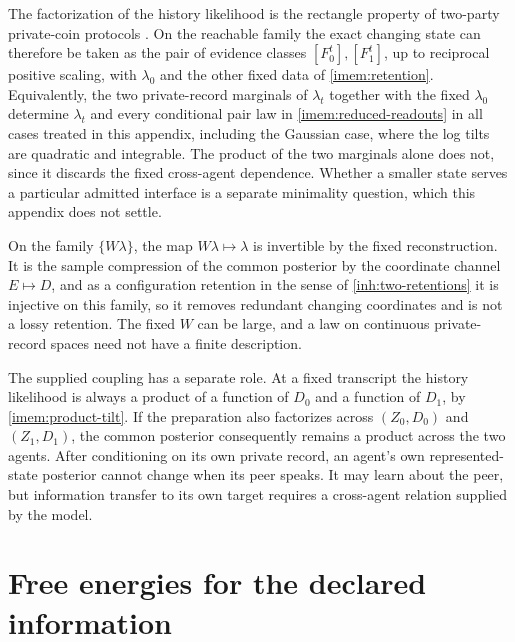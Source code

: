 The factorization of the history likelihood is the rectangle property of two-party private-coin protocols \citep[Lemma 6.7]{BarYossefEtAl2004}. On the reachable family the exact changing state can therefore be taken as the pair of evidence classes $[F_0^t],[F_1^t]$, up to reciprocal positive scaling, with $\lambda_0$ and the other fixed data of \cref{imem:retention}. Equivalently, the two private-record marginals of $\lambda_t$ together with the fixed $\lambda_0$ determine $\lambda_t$ and every conditional pair law in \cref{imem:reduced-readouts} in all cases treated in this appendix, including the Gaussian case, where the log tilts are quadratic and integrable. The product of the two marginals alone does not, since it discards the fixed cross-agent dependence. Whether a smaller state serves a particular admitted interface is a separate minimality question, which this appendix does not settle.

On the family $\{W\lambda\}$, the map $W\lambda\mapsto\lambda$ is invertible by the fixed reconstruction. It is the sample compression of the common posterior by the coordinate channel $E\mapsto D$, and as a configuration retention in the sense of \cref{inh:two-retentions} it is injective on this family, so it removes redundant changing coordinates and is not a lossy retention. The fixed $W$ can be large, and a law on continuous private-record spaces need not have a finite description.

The supplied coupling has a separate role. At a fixed transcript the history likelihood is always a product of a function of $D_0$ and a function of $D_1$, by \cref{imem:product-tilt}. If the preparation also factorizes across $(Z_0,D_0)$ and $(Z_1,D_1)$, the common posterior consequently remains a product across the two agents. After conditioning on its own private record, an agent's own represented-state posterior cannot change when its peer speaks. It may learn about the peer, but information transfer to its own target requires a cross-agent relation supplied by the model.

\section{Free energies for the declared information}

